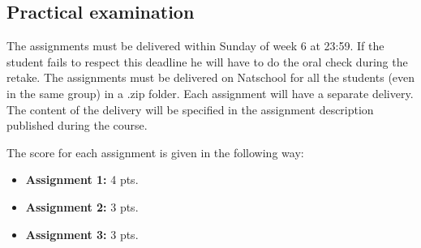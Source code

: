 	\subsection{Practical examination}
		The assignments must be delivered within Sunday of week 6 at 23:59. If the student fails to respect this deadline he will have to do the oral check during the retake. The assignments must be delivered on Natschool for all the students (even in the same group) in a .zip folder. Each assignment will have a separate delivery. The content of the delivery will be specified in the assignment description published during the course.
		
		The score for each assignment is given in the following way:
		\begin{itemize}
		\item \textbf{Assignment 1: } 4 pts.
		\item \textbf{Assignment 2: } 3 pts.
		\item \textbf{Assignment 3: } 3 pts.
		\end{itemize}
